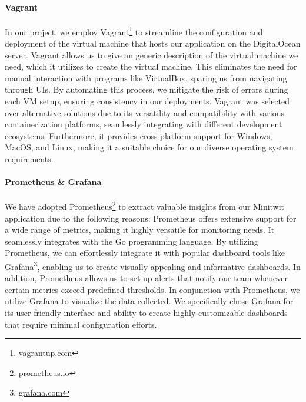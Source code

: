 \paragraph*{Vagrant}
In our project, we employ Vagrant\footnote{\href{https://www.vagrantup.com/}{vagrantup.com}} to streamline the configuration and deployment of the virtual machine that hosts our application on the DigitalOcean server. Vagrant allows us to give an generic description of the virtual machine we need, which it utilizes to create the virtual machine. This eliminates the need for manual interaction with programs like VirtualBox, sparing us from navigating through UIs. By automating this process, we mitigate the risk of errors during each VM setup, ensuring consistency in our deployments. Vagrant was selected over alternative solutions due to its versatility and compatibility with various containerization platforms, seamlessly integrating with different development ecosystems. Furthermore, it provides cross-platform support for Windows, MacOS, and Linux, making it a suitable choice for our diverse operating system requirements.

\paragraph*{Prometheus \& Grafana}
We have adopted Prometheus\footnote{\href{https://prometheus.io/}{prometheus.io}} to extract valuable insights from our Minitwit application due to the following reasons: Prometheus offers extensive support for a wide range of metrics, making it highly versatile for monitoring needs. It seamlessly integrates with the Go programming language. By utilizing Prometheus, we can effortlessly integrate it with popular dashboard tools like Grafana\footnote{\href{https://grafana.com/}{grafana.com}}, enabling us to create visually appealing and informative dashboards. In addition, Prometheus allows us to set up alerts that notify our team whenever certain metrics exceed predefined thresholds. In conjunction with Prometheus, we utilize Grafana to visualize the data collected. We specifically chose Grafana for its user-friendly interface and ability to create highly customizable dashboards that require minimal configuration efforts.

